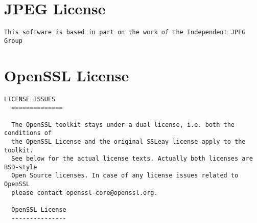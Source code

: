 \section{JPEG License}
\label{webots.jpeglicense}%

\begin{lstlisting}[firstnumber=1,]
This software is based in part on the work of the Independent JPEG Group
\end{lstlisting}
\section{OpenSSL License}
\label{webots.openssllicense}%

\begin{lstlisting}[firstnumber=1,]
  LICENSE ISSUES
  ==============

  The OpenSSL toolkit stays under a dual license, i.e. both the conditions of
  the OpenSSL License and the original SSLeay license apply to the toolkit.
  See below for the actual license texts. Actually both licenses are BSD-style
  Open Source licenses. In case of any license issues related to OpenSSL
  please contact openssl-core@openssl.org.

  OpenSSL License
  ---------------


\end{lstlisting}
